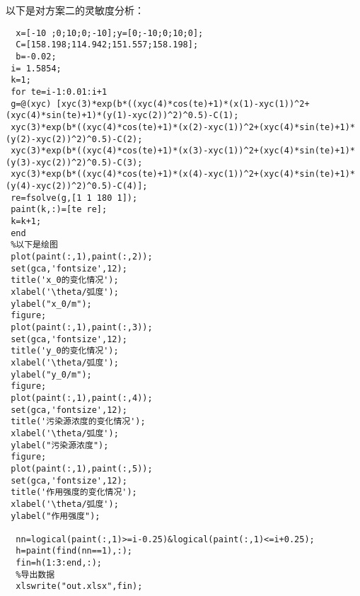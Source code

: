 \documentclass[UTF8]{ctexart}
\begin{document}
以下是对方案二的灵敏度分析：
\begin{lstlisting}
  x=[-10 ;0;10;0;-10];y=[0;-10;0;10;0];
  C=[158.198;114.942;151.557;158.198];
  b=-0.02;
 i= 1.5854;
 k=1;
 for te=i-1:0.01:i+1
 g=@(xyc) [xyc(3)*exp(b*((xyc(4)*cos(te)+1)*(x(1)-xyc(1))^2+(xyc(4)*sin(te)+1)*(y(1)-xyc(2))^2)^0.5)-C(1);
 xyc(3)*exp(b*((xyc(4)*cos(te)+1)*(x(2)-xyc(1))^2+(xyc(4)*sin(te)+1)*(y(2)-xyc(2))^2)^0.5)-C(2);
 xyc(3)*exp(b*((xyc(4)*cos(te)+1)*(x(3)-xyc(1))^2+(xyc(4)*sin(te)+1)*(y(3)-xyc(2))^2)^0.5)-C(3);
 xyc(3)*exp(b*((xyc(4)*cos(te)+1)*(x(4)-xyc(1))^2+(xyc(4)*sin(te)+1)*(y(4)-xyc(2))^2)^0.5)-C(4)];
 re=fsolve(g,[1 1 180 1]);
 paint(k,:)=[te re];
 k=k+1;
 end
 %以下是绘图
 plot(paint(:,1),paint(:,2));
 set(gca,'fontsize',12);
 title('x_0的变化情况');
 xlabel('\theta/弧度');
 ylabel("x_0/m");
 figure;
 plot(paint(:,1),paint(:,3));
 set(gca,'fontsize',12);
 title('y_0的变化情况');
 xlabel('\theta/弧度');
 ylabel("y_0/m");
 figure;
 plot(paint(:,1),paint(:,4));
 set(gca,'fontsize',12);
 title('污染源浓度的变化情况');
 xlabel('\theta/弧度');
 ylabel("污染源浓度");
 figure;
 plot(paint(:,1),paint(:,5));
 set(gca,'fontsize',12);
 title('作用强度的变化情况');
 xlabel('\theta/弧度');
 ylabel("作用强度");
 
  nn=logical(paint(:,1)>=i-0.25)&logical(paint(:,1)<=i+0.25);
  h=paint(find(nn==1),:);
  fin=h(1:3:end,:);
  %导出数据
  xlswrite("out.xlsx",fin);
  
 
\end{lstlisting} 
\end{document}

